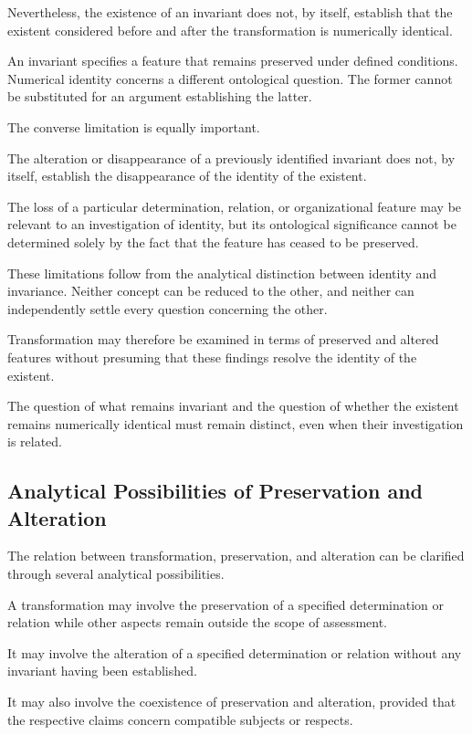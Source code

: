 Nevertheless, the existence of an invariant does
not, by itself, establish that the existent considered
before and after the transformation is numerically
identical.

An invariant specifies a feature that remains
preserved under defined conditions. Numerical
identity concerns a different ontological question.
The former cannot be substituted for an argument
establishing the latter.

The converse limitation is equally important.

The alteration or disappearance of a previously
identified invariant does not, by itself, establish
the disappearance of the identity of the existent.

The loss of a particular determination, relation,
or organizational feature may be relevant to an
investigation of identity, but its ontological
significance cannot be determined solely by the
fact that the feature has ceased to be preserved.

These limitations follow from the analytical
distinction between identity and invariance.
Neither concept can be reduced to the other, and
neither can independently settle every question
concerning the other.

Transformation may therefore be examined in terms
of preserved and altered features without presuming
that these findings resolve the identity of the
existent.

The question of what remains invariant and the
question of whether the existent remains numerically
identical must remain distinct, even when their
investigation is related.

\subsection{Analytical Possibilities of Preservation and Alteration}

The relation between transformation, preservation,
and alteration can be clarified through several
analytical possibilities.

A transformation may involve the preservation of
a specified determination or relation while other
aspects remain outside the scope of assessment.

It may involve the alteration of a specified
determination or relation without any invariant
having been established.

It may also involve the coexistence of preservation
and alteration, provided that the respective claims
concern compatible subjects or respects.

